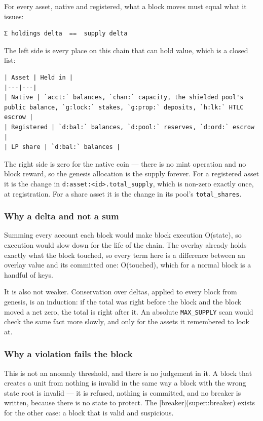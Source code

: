 \documentclass[11pt,a4paper]{article}
\begin{document}
For every asset, native and registered, what a block moves must equal what
it issues:

\begin{verbatim}
Σ holdings delta  ==  supply delta
\end{verbatim}

The left side is every place on this chain that can hold value, which is a
closed list:

\begin{verbatim}
| Asset | Held in |
|---|---|
| Native | `acct:` balances, `chan:` capacity, the shielded pool's public balance, `g:lock:` stakes, `g:prop:` deposits, `h:lk:` HTLC escrow |
| Registered | `d:bal:` balances, `d:pool:` reserves, `d:ord:` escrow |
| LP share | `d:bal:` balances |
\end{verbatim}

The right side is zero for the native coin — there is no mint operation and
no block reward, so the genesis allocation is the supply forever. For a
registered asset it is the change in \texttt{d:asset:<id>.total\_supply}, which is
non-zero exactly once, at registration. For a share asset it is the change
in its pool's \texttt{total\_shares}.

\subsubsection{Why a delta and not a sum}

Summing every account each block would make block execution O(state), so
execution would slow down for the life of the chain. The overlay already
holds exactly what the block touched, so every term here is a difference
between an overlay value and its committed one: O(touched), which for a
normal block is a handful of keys.

It is also not weaker. Conservation over deltas, applied to every block from
genesis, is an induction: if the total was right before the block and the
block moved a net zero, the total is right after it. An absolute
\texttt{MAX\_SUPPLY} scan would check the same fact more slowly, and only for the
assets it remembered to look at.

\subsubsection{Why a violation fails the block}

This is not an anomaly threshold, and there is no judgement in it. A block
that creates a unit from nothing is invalid in the same way a block with the
wrong state root is invalid — it is refused, nothing is committed, and no
breaker is written, because there is no state to protect. The
[breaker](super::breaker) exists for the other case: a block that is valid
and suspicious.
\end{document}
